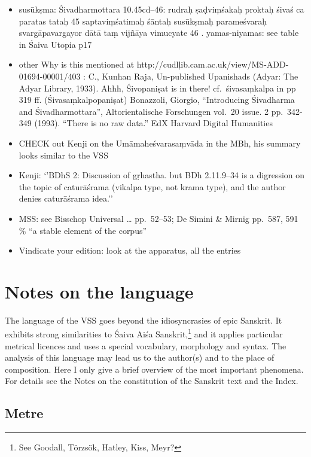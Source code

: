 \documentclass[]{article}
\begin{document}
\begin{itemize}
\item
  susūkṣma: Śivadharmottara 10.45cd--46: rudraḥ ṣaḍviṃśakaḥ proktaḥ
  śivaś ca paratas tataḥ \textbar{}\textbar{} 45 \textbar{}\textbar{}
  saptaviṃśatimaḥ śāntaḥ susūkṣmaḥ parameśvaraḥ \textbar{}
  svargāpavargayor dātā taṃ vijñāya vimucyate \textbar{}\textbar{} 46
  \textbar{}\textbar{}. yamas-niyamas: see table in Śaiva Utopia p17
\item
  other Why is this mentioned at
  http://cudlḷib.cam.ac.uk/view/MS-ADD-01694-00001/403 : C., Kunhan
  Raja, Un-published Upanishads (Adyar: The Adyar Library, 1933). Ahhh,
  Śivopaniṣat is in there! cf.~śivasaṃkalpa in pp 319 ff.
  (Śivasaṃkalpopaniṣat) Bonazzoli, Giorgio, ``Introducing Śivadharma and
  Śivadharmottara'', Altorientalische Forschungen vol.~20 issue. 2
  pp.~342-349 (1993). ``There is no raw data.'' EdX Harvard Digital
  Humanities
\item
  CHECK out Kenji on the Umāmaheśvarasaṃvāda in the MBh, his summary
  looks similar to the VSS
\item
  Kenji: `'BDhS 2: Discussion of gṛhastha. but BDh 2.11.9--34 is a
  digression on the topic of caturāśrama (vikalpa type, not krama type),
  and the author denies caturāśrama idea.''
\item
  MSS: see Bisschop Universal \ldots{} pp.~52--53; De Simini \& Mirnig
  pp.~587, 591 \% ``a stable element of the corpus''
\item
  Vindicate your edition: look at the apparatus, all the \Ed entries
\end{itemize}

\hypertarget{notes-on-the-language}{%
\section{Notes on the language}\label{notes-on-the-language}}

The language of the VSS goes beyond the idiosyncrasies of epic Sanskrit.
It exhibits strong similarities to Śaiva Aiśa Sanskrit,\footnote{See
  Goodall, Törzsök, Hatley, Kiss, Meyr?} and it applies particular
metrical licences and uses a special vocabulary, morphology and syntax.
The analysis of this language may lead us to the author(s) and to the
place of composition. Here I only give a brief overview of the most
important phenomena. For details see the Notes on the constitution of
the Sanskrit text and the Index.

\hypertarget{metre}{%
\subsection{Metre}\label{metre}}
\end{document}
